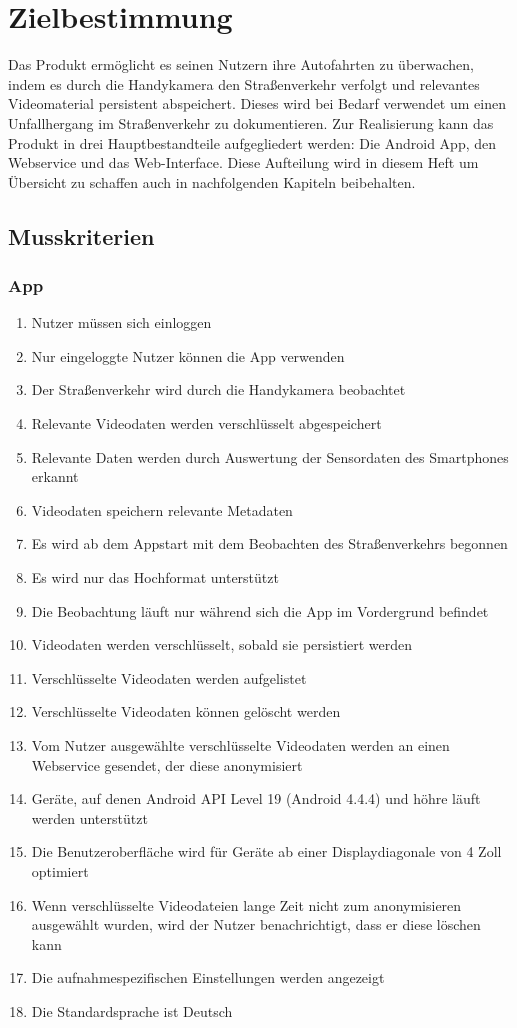 \chapter{Zielbestimmung}
Das Produkt ermöglicht es seinen Nutzern ihre Autofahrten zu überwachen, indem es durch die Handykamera den Straßenverkehr verfolgt und relevantes Videomaterial persistent abspeichert. Dieses wird bei Bedarf verwendet um einen Unfallhergang im Straßenverkehr zu dokumentieren.
Zur Realisierung kann das Produkt in drei Hauptbestandteile aufgegliedert werden: Die Android App, den Webservice und das Web-Interface. Diese Aufteilung wird in diesem Heft um Übersicht zu schaffen auch in nachfolgenden Kapiteln beibehalten.

\section{Musskriterien}
\subsection{App}
	\begin{enumerate}[\bfseries{/PK}1010/]
	\item Nutzer müssen sich einloggen
	\item Nur eingeloggte Nutzer können die App verwenden 
	\item Der Straßenverkehr wird durch die Handykamera beobachtet 
	\item Relevante Videodaten werden verschlüsselt abgespeichert
	\item Relevante Daten werden durch Auswertung der Sensordaten des Smartphones erkannt
	\item Videodaten speichern relevante Metadaten
	\item Es wird ab dem Appstart mit dem Beobachten des Straßenverkehrs begonnen
	\item Es wird nur das Hochformat unterstützt
	\item Die Beobachtung läuft nur während sich die App im Vordergrund befindet
	\item Videodaten werden verschlüsselt, sobald sie persistiert werden
	\item Verschlüsselte Videodaten werden aufgelistet
	\item Verschlüsselte Videodaten können gelöscht werden
	\item Vom Nutzer ausgewählte verschlüsselte Videodaten werden an einen Webservice gesendet, der diese anonymisiert
	\item Geräte, auf denen Android API Level 19 (Android 4.4.4) und höhre läuft werden unterstützt
	\item Die Benutzeroberfläche wird für Geräte ab einer Displaydiagonale von 4 Zoll optimiert
	\item Wenn verschlüsselte Videodateien lange Zeit nicht zum anonymisieren ausgewählt wurden, wird der Nutzer benachrichtigt, dass er diese löschen kann
	\item Die aufnahmespezifischen Einstellungen werden angezeigt
	\item Die Standardsprache ist Deutsch
	\end{enumerate}
